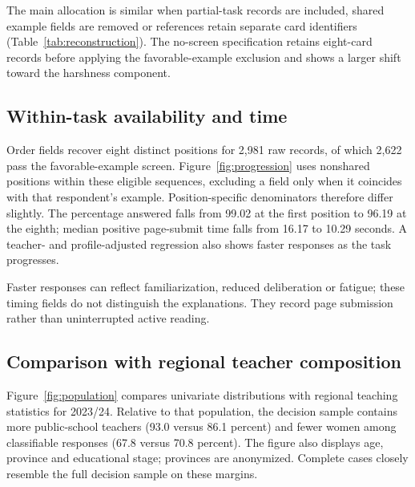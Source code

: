 The main allocation is similar when partial-task records are included, shared example fields are removed or references retain separate card identifiers (Table~\ref{tab:reconstruction}). The no-screen specification retains eight-card records before applying the favorable-example exclusion and shows a larger shift toward the harshness component.


\subsection{Within-task availability and time}
Order fields recover eight distinct positions for 2,981 raw records, of which 2,622 pass the favorable-example screen. Figure~\ref{fig:progression} uses nonshared positions within these eligible sequences, excluding a field only when it coincides with that respondent's example. Position-specific denominators therefore differ slightly. The percentage answered falls from 99.02 at the first position to 96.19 at the eighth; median positive page-submit time falls from 16.17 to 10.29 seconds. A teacher- and profile-adjusted regression also shows faster responses as the task progresses.

Faster responses can reflect familiarization, reduced deliberation or fatigue; these timing fields do not distinguish the explanations. They record page submission rather than uninterrupted active reading.

\subsection{Comparison with regional teacher composition}
Figure~\ref{fig:population} compares univariate distributions with regional teaching statistics for 2023/24. Relative to that population, the decision sample contains more public-school teachers (93.0 versus 86.1 percent) and fewer women among classifiable responses (67.8 versus 70.8 percent). The figure also displays age, province and educational stage; provinces are anonymized. Complete cases closely resemble the full decision sample on these margins.

